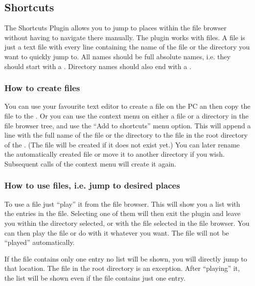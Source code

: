 \subsection{Shortcuts}

The Shortcuts Plugin allows you to jump to places within the file browser
without having to navigate there manually. The plugin works with
 files. A  file is just a text file with every
line containing the name of the file or the directory you want to quickly
jump to. All names should be full absolute names, i.e. they should start
with a \fname{/}. Directory names should also end with a \fname{/}.

\subsubsection{How to create  files}

You can use your favourite text editor to create a  file on the
PC an then copy the file to the \dap{}. Or you can use the context menu on
either a file or a directory in the file browser tree, and use the ``Add to
shortcuts'' menu option. This will append a line with the full name of the
file or the directory to the  file in the root
directory of the \dap{}. (The file will be created if it does not exist
yet.) You can later rename the automatically created 
file or move it to another directory if you wish. Subsequent calls of the
context menu will create it again.


\subsubsection{How to use  files, i.e. jump to desired places}

To use a  file just ``play'' it from the file browser. This will
show you a list with the entries in the file. Selecting one of them will
then exit the plugin and leave you within the directory selected, or with
the file selected in the file browser. You can then play the file or do
with it whatever you want. The file will not be ``played'' automatically.

If the  file contains only one entry no list will be shown, you
will directly jump to that location. The file  in the
root directory is an exception. After ``playing'' it, the list will be shown
even if the file contains just one entry.

